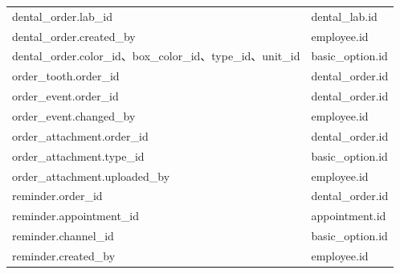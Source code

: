 \begin{longtable}{L{8.0cm}L{6.5cm}}
dental\_order.lab\_id & dental\_lab.id\\
dental\_order.created\_by & employee.id\\
dental\_order.color\_id、box\_color\_id、type\_id、unit\_id & basic\_option.id\\
order\_tooth.order\_id & dental\_order.id\\
order\_event.order\_id & dental\_order.id\\
order\_event.changed\_by & employee.id\\
order\_attachment.order\_id & dental\_order.id\\
order\_attachment.type\_id & basic\_option.id\\
order\_attachment.uploaded\_by & employee.id\\
reminder.order\_id & dental\_order.id\\
reminder.appointment\_id & appointment.id\\
reminder.channel\_id & basic\_option.id\\
reminder.created\_by & employee.id\\
\bottomrule\end{longtable}
\endgroup
